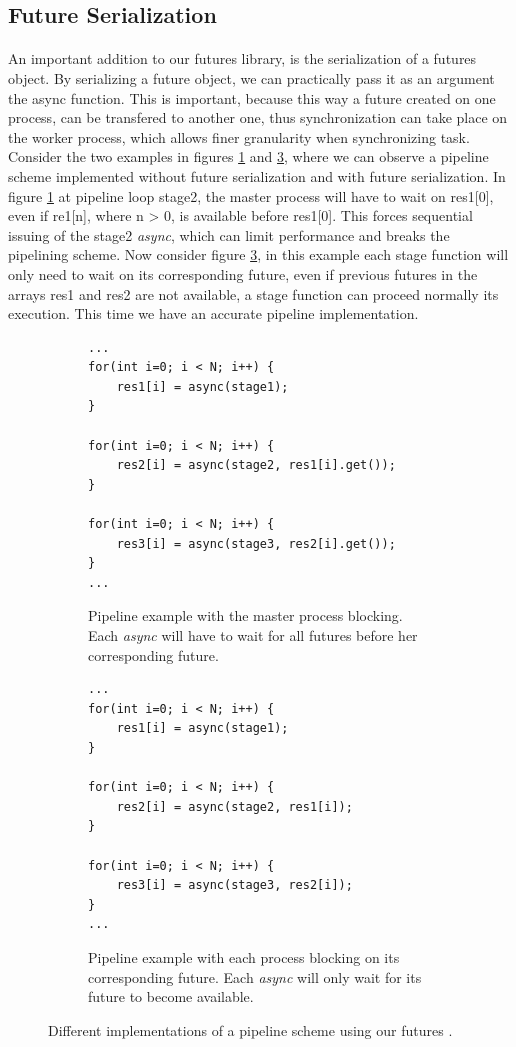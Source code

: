\subsection{Future Serialization}
\paragraph{}
An important addition to our futures library, is the serialization of a futures object.  By serializing a future
object, we can practically pass it as an argument the async function.  This is important, because this way
a future created on one process, can be transfered to another one, thus synchronization can take place on the 
worker process, which allows finer granularity when synchronizing task.  Consider the two examples in figures 
\ref{lst:pipe_futures_a} and \ref{lst:pipe_futures_b}, where we can observe a pipeline scheme implemented 
without future serialization and with future serialization.  In figure \ref{lst:pipe_futures_a} at pipeline
loop stage2, the master process will have to wait on res1[0], even if re1[n], where n > 0, is available before
res1[0].  This forces sequential issuing of the stage2 \emph{async}, which can limit performance and breaks the 
pipelining scheme.  Now consider figure \ref{lst:pipe_futures_b}, in this example each stage function will only
need to wait on its corresponding future, even if previous futures in the arrays res1 and res2 are not available,
a stage function can proceed normally its execution.  This time we have an accurate pipeline implementation.

\begin{figure}[!ht]
\begin{subfigure}[b]{0.4\textwidth}
\begin{lstlisting}
...
for(int i=0; i < N; i++) {
	res1[i] = async(stage1);
}

for(int i=0; i < N; i++) {
	res2[i] = async(stage2, res1[i].get());
} 

for(int i=0; i < N; i++) {
	res3[i] = async(stage3, res2[i].get());
} 
...
\end{lstlisting}
\caption{	Pipeline example with the master process blocking.  
					Each \emph{async} will have to wait for all futures before her corresponding future.}
\label{lst:pipe_futures_a}
\end{subfigure}

\begin{subfigure}[b]{0.4\textwidth}
\begin{lstlisting}
...
for(int i=0; i < N; i++) {
	res1[i] = async(stage1);
}

for(int i=0; i < N; i++) {
	res2[i] = async(stage2, res1[i]);
} 

for(int i=0; i < N; i++) {
	res3[i] = async(stage3, res2[i]);
} 
...
\end{lstlisting}
\caption{	Pipeline example with each process blocking on its corresponding future.
					Each \emph{async} will only wait for its future to become available.}
\label{lst:pipe_futures_b}
\end{subfigure}
\caption{	Different implementations of a pipeline scheme using our futures .}
\end{figure}

